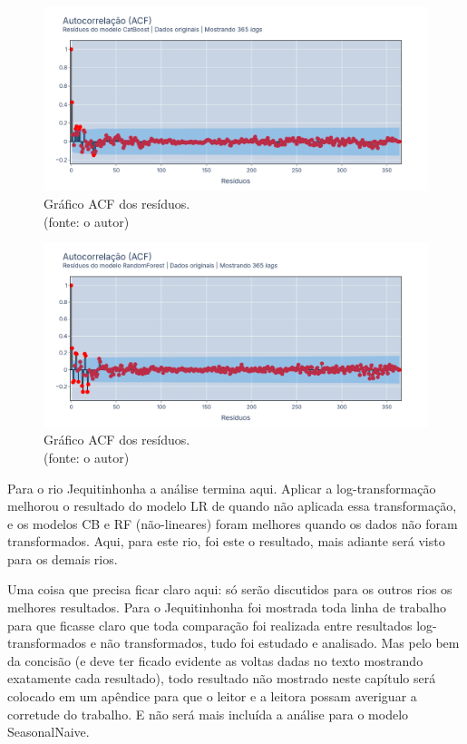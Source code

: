 \begin{figure}[!h]
\centering
\includegraphics[scale=0.33]{Figuras/jequiti/resultados/CB_WFV_ORIG_RESID_ACF.png}
\caption{Gráfico ACF dos resíduos.\\(fonte: o autor)}
\label{fig:jequiti_CB_WFV_ORIG_RESID_ACF}
\end{figure}

\begin{figure}[!h]
\centering
\includegraphics[scale=0.33]{Figuras/jequiti/resultados/RF_WFV_ORIG_RESID_ACF.png}
\caption{Gráfico ACF dos resíduos.\\(fonte: o autor)}
\label{fig:jequiti_RF_WFV_ORIG_RESID_ACF}
\end{figure}
\clearpage

Para o rio Jequitinhonha a análise termina aqui. Aplicar a log-transformação melhorou o resultado do modelo LR de quando não aplicada essa transformação, e os modelos CB e RF (não-lineares) foram melhores quando os dados não foram transformados. Aqui, para este rio, foi este o resultado, mais adiante será visto para os demais rios.

Uma coisa que precisa ficar claro aqui: só serão discutidos para os outros rios os melhores resultados. Para o Jequitinhonha foi mostrada toda linha de trabalho para que ficasse claro que toda comparação foi realizada entre resultados log-transformados e não transformados, tudo foi estudado e analisado. Mas pelo bem da concisão (e deve ter ficado evidente as voltas dadas no texto mostrando exatamente cada resultado), todo resultado não mostrado neste capítulo será colocado em um apêndice para que o leitor e a leitora possam averiguar a corretude do trabalho. E não será mais incluída a análise para o modelo SeasonalNaive.


